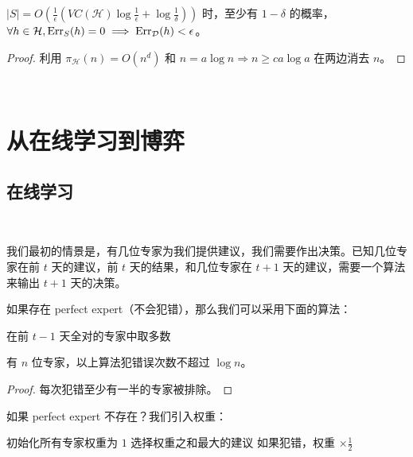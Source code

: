\begin{corollary}
    $|S| = O\left(\frac{1}{\epsilon} (VC(\mathcal{H}) \log \frac{1}{\epsilon} + \log \frac{1}{\delta})\right)$ 时，至少有 $1-\delta$ 的概率，
    $\forall h \in \mathcal{H}, \text{Err}_S(h)=0 \implies \text{Err}_{\mathcal{D}}(h) < \epsilon$。
\end{corollary}

\begin{proof}
    利用 $\pi_{\mathcal{H}}(n) = O(n^d)$ 和 $n=a \log n \Rightarrow n \ge c a \log a$ 在两边消去 $n$。
\end{proof}

~

\section{从在线学习到博弈}

\subsection{在线学习} ~

我们最初的情景是，有几位专家为我们提供建议，我们需要作出决策。已知几位专家在前 $t$ 天的建议，前 $t$ 天的结果，和几位专家在 $t+1$ 天的建议，需要一个算法来输出 $t+1$ 天的决策。

如果存在 perfect expert（不会犯错），那么我们可以采用下面的算法：

\begin{algorithm}[h]
    \caption{majority 算法}
    \begin{algorithmic}[1]
            \State 在前 $t - 1$ 天全对的专家中取多数
        \EndFor
    \end{algorithmic}
\end{algorithm}

\begin{theorem}
    有 $n$ 位专家，以上算法犯错误次数不超过 $\log n$。
\end{theorem}

\begin{proof}
    每次犯错至少有一半的专家被排除。
\end{proof}

如果 perfect expert 不存在？我们引入权重：

\begin{algorithm}[h]
    \caption{weighted majority 算法}
    \begin{algorithmic}[1]
        \State 初始化所有专家权重为 $1$
        \Loop
            \State 选择权重之和最大的建议
            \State 如果犯错，权重 $\times \frac{1}{2}$
        \EndLoop
    \end{algorithmic}
\end{algorithm}

